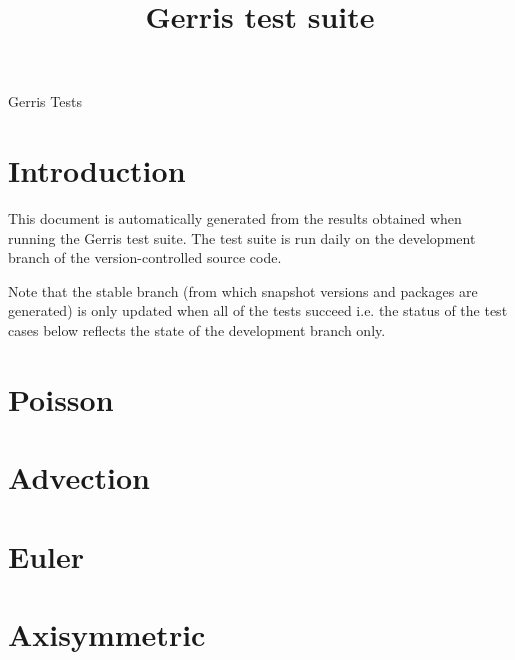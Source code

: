\documentclass[a4paper]{article}
\title{Gerris test suite}
\begin{document}
\mbox{}\vspace{1cm}
\begin{center}
{\huge Gerris Tests}\\
\vspace{1cm}

\vspace{5mm}
\end{center}

\section{Introduction}

This document is automatically generated from the results obtained
when running the Gerris test suite. The test suite is run daily on the
development branch of the version-controlled source code. 

Note that the stable branch (from which snapshot versions and packages
are generated) is only updated when all of the tests succeed i.e. the
status of the test cases below reflects the state of the development
branch only.

\section{Poisson}









\section{Advection}





\section{Euler}






\section{Axisymmetric}




\end{document}
